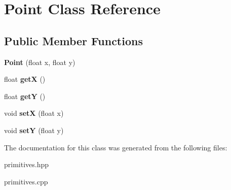 \hypertarget{classPoint}{}\section{Point Class Reference}
\label{classPoint}
\subsection*{Public Member Functions}
\begin{DoxyCompactItemize}
\item 
\mbox{\label{classPoint_a30bc8409287de4f43e160664be834636}} 
{\bfseries Point} (float x, float y)
\item 
\mbox{\label{classPoint_acc27466778cc87a662bba40268c4c0c8}} 
float {\bfseries getX} ()
\item 
\mbox{\label{classPoint_a3cccbca94719ddde353cce86ce0e2f64}} 
float {\bfseries getY} ()
\item 
\mbox{\label{classPoint_ac24951f100ad7704f06f59b9cc1956ba}} 
void {\bfseries setX} (float x)
\item 
\mbox{\label{classPoint_a18b8e100ef3ba704ac407cfc7451475c}} 
void {\bfseries setY} (float y)
\end{DoxyCompactItemize}


The documentation for this class was generated from the following files\+:\begin{DoxyCompactItemize}
\item 
primitives.\+hpp\item 
primitives.\+cpp\end{DoxyCompactItemize}
